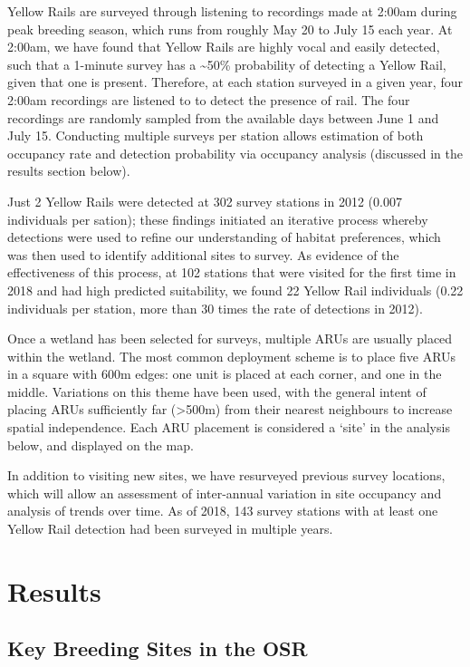 \documentclass[11pt,]{article}
\begin{document}
Yellow Rails are surveyed through listening to recordings made at 2:00am
during peak breeding season, which runs from roughly May 20 to July 15
each year. At 2:00am, we have found that Yellow Rails are highly vocal
and easily detected, such that a 1-minute survey has a
\textasciitilde{}50\% probability of detecting a Yellow Rail, given that
one is present. Therefore, at each station surveyed in a given year,
four 2:00am recordings are listened to to detect the presence of rail.
The four recordings are randomly sampled from the available days between
June 1 and July 15. Conducting multiple surveys per station allows
estimation of both occupancy rate and detection probability via
occupancy analysis (discussed in the results section below).

Just 2 Yellow Rails were detected at 302 survey stations in 2012 (0.007
individuals per sation); these findings initiated an iterative process
whereby detections were used to refine our understanding of habitat
preferences, which was then used to identify additional sites to survey.
As evidence of the effectiveness of this process, at 102 stations that
were visited for the first time in 2018 and had high predicted
suitability, we found 22 Yellow Rail individuals (0.22 individuals per
station, more than 30 times the rate of detections in 2012).

Once a wetland has been selected for surveys, multiple ARUs are usually
placed within the wetland. The most common deployment scheme is to place
five ARUs in a square with 600m edges: one unit is placed at each
corner, and one in the middle. Variations on this theme have been used,
with the general intent of placing ARUs sufficiently far
(\textgreater{}500m) from their nearest neighbours to increase spatial
independence. Each ARU placement is considered a `site' in the analysis
below, and displayed on the map.

In addition to visiting new sites, we have resurveyed previous survey
locations, which will allow an assessment of inter-annual variation in
site occupancy and analysis of trends over time. As of 2018, 143 survey
stations with at least one Yellow Rail detection had been surveyed in
multiple years.

\section{Results}\label{results}

\subsection{Key Breeding Sites in the
OSR}\label{key-breeding-sites-in-the-osr}
\end{document}
